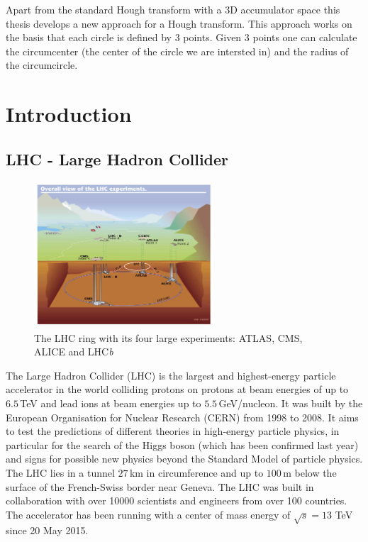 \documentclass[11pt]{scrreprt}
\begin{document}
Apart from the standard Hough transform with a 3D accumulator space this thesis develops a new approach for a Hough transform. 
This approach works on the basis that each circle is defined by 3 points. Given 3 points one can calculate the circumcenter 
(the center of the circle we are intersted in) and the radius of the circumcircle.

\tableofcontents
\listoftables
\listoffigures	
\listofcodesnippets

\chapter{Introduction}
\section{LHC - Large Hadron Collider} %
\label{sec:lhc_large_hadron_collider}
\begin{figure}[htb]
  \centering
  \includegraphics[width=0.6\textwidth]{pics/lhc}
  \caption{The LHC ring with its four large experiments: ATLAS, CMS, ALICE and LHC\textit{b}}
  \label{fig:lhc}
\end{figure}

The Large Hadron Collider (LHC) is the largest and highest-energy particle accelerator in the world colliding protons on protons
at beam energies of up to $6.5$\,TeV and lead ions at beam energies up to $5.5$\,GeV/nucleon. It was built by the European 
Organisation for Nuclear Research (CERN) from 1998 to 2008. It aims to test the predictions of different theories in high-energy particle 
physics, in particular for the search of the Higgs boson (which has been confirmed last year) and signs for possible new physics beyond 
the Standard Model of particle physics. The LHC lies in a tunnel $27$\,km in circumference and up to $100$\,m below the surface of the 
French-Swiss border near Geneva. The LHC was built in collaboration with over 10000 scientists and engineers from over 100 countries. 
The accelerator has been running with a center of mass energy of $\sqrt{s} = 13$ TeV since 20 May 2015.
\end{document}
